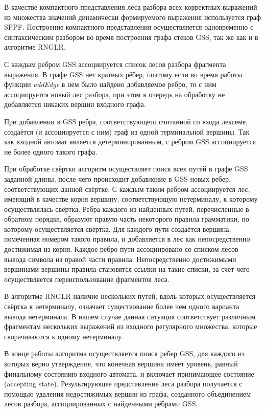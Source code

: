 В качестве компактного представления леса разбора всех корректных выражений из множества значений динамически формируемого выражения используется граф SPPF. Построение компактного представления осуществляется одновременно с синтаксическим разбором во время построения графа стеков GSS, так же как и в алгоритме RNGLR.

С каждым ребром GSS ассоциируется список лесов разбора фрагмента выражения. В графе GSS нет кратных рёбер, поэтому если во время работы функции \emph{addEdge} в нем было найдено добавляемое ребро, то с ним ассоциируется новый лес разбора, при этом в очередь на обработку не добавляется никаких вершин входного графа.  

При добавлении в GSS ребра, соответствующего считанной со входа лексеме, создаётся (и ассоциируется с ним) граф из одной терминальной вершины. Так как входной автомат является детерминированным, с ребром GSS ассоциируется не более одного такого графа.

При обработке свёртки алгоритм осуществляет поиск всех путей в графе GSS заданной длины, после чего происходит добавление в GSS новых ребер, соответствующих данной свёртке. С каждым таким ребром ассоциируется лес, имеющий в качестве корня вершину, соответствующую нетерминалу, к которому осуществлялась свёртка. Ребра каждого из найденных путей, перечисленные в обратном порядке, образуют правую часть некоторого правила грамматики, по которому осуществляется свёртка. Для каждого пути создаётся вершина, помеченная номером такого правила, и добавляется в лес как непосредственно достижимая из корня. Каждое ребро пути ассоциировано со списком лесов вывода символа из правой части правила. Непосредственно достижимыми вершинами вершины-правила становятся ссылки на такие списки, за счёт чего осуществляется переиспользование фрагментов леса.

В алгоритме RNGLR наличие нескольких путей, вдоль которых осуществляется свёртка к нетерминалу, означает существование более чем одного варианта вывода нетерминала. В нашем случае данная ситуация соответствует различным фрагментам нескольких выражений из входного регулярного множества, которые сворачиваются к одному нетерминалу. 

В конце работы алгоритма осуществляется поиск ребер GSS, для каждого из которых верно утверждение, что конечная вершина имеет уровень, равный финальному состоянию входного автомата, и включает принимающее состояние (accepting state). Результирующее представление леса разбора получается с помощью удаления недостижимых вершин из графа, созданного объединением лесов разбора, ассоциированных с найденными рёбрами GSS.

